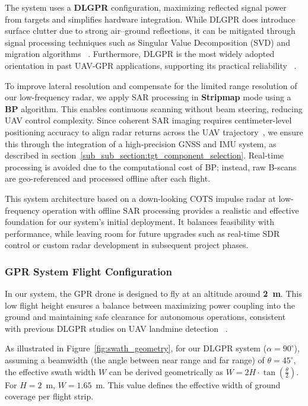 The system uses a \textbf{\gls{DLGPR}} configuration, maximizing reflected signal power from targets and simplifies hardware integration. While \gls{DLGPR} does introduce surface clutter due to strong air–ground reflections, it can be mitigated through signal processing techniques such as Singular Value Decomposition (SVD) and migration algorithms ~\cite{garcia2024comparison}. Furthermore, \gls{DLGPR} is the most widely adopted orientation in past \gls{UAV}-\gls{GPR} applications, supporting its practical reliability ~\cite{9758040}.

To improve lateral resolution and compensate for the limited range resolution of our low-frequency radar, we apply \gls{SAR} processing in \textbf{Stripmap} mode using a \textbf{\gls{BP}} algorithm. This enables continuous scanning without beam steering, reducing \gls{UAV} control complexity. Since coherent SAR imaging requires centimeter-level positioning accuracy to align radar returns across the UAV trajectory~\cite{fernandez2018synthetic}, we ensure this through the integration of a high-precision GNSS and IMU system, as described in section~\ref{sub_sub_section:tgt_component_selection}. Real-time processing is avoided due to the computational cost of \gls{BP}; instead, raw B-scans are geo-referenced and processed offline after each flight.

This system architecture based on a down-looking \gls{COTS} impulse radar at low-frequency operation with offline \gls{SAR} processing provides a realistic and effective foundation for our system’s initial deployment. It balances feasibility with performance, while leaving room for future upgrades such as real-time \gls{SDR} control or custom radar development in subsequent project phases.



\subsubsection{\gls{GPR} System Flight Configuration}\label{GPR_flight}

In our system, the \gls{GPR} drone is designed to fly at an altitude around \textbf{2~m}. This low flight height ensures a balance between maximizing power coupling into the ground and maintaining safe clearance for autonomous operations, consistent with previous \gls{DLGPR} studies on \gls{UAV} landmine detection ~\cite{schartel2018uav,9758040}.

As illustrated in Figure~\ref{fig:swath_geometry}, for our \gls{DLGPR} system ($\alpha = 90^\circ$), assuming a beamwidth (the angle between near range and far range) of $\theta = 45^\circ$, the effective swath width $W$ can be derived geometrically as \(W = 2H \cdot \tan\left(\frac{\theta}{2}\right)\). For $H = 2$~m,  $W = 1.65$~m. This value defines the effective width of ground coverage per flight strip.

